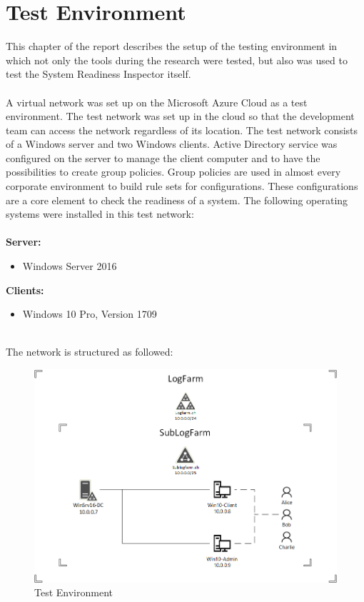 \section{Test Environment}\label{sec:testenvironment}
This chapter of the report describes the setup of the testing environment in which not only the tools during the research were tested, but also was used to test the System Readiness Inspector itself.
\\\\
A virtual network was set up on the Microsoft Azure Cloud as a test environment. The test network was set up in the cloud so that the development team can access the network regardless of its location. The test network consists of a Windows server and two Windows clients. Active Directory service was configured on the server to manage the client computer and to have the possibilities to create group policies. Group policies are used in almost every corporate environment to build rule sets for configurations. These configurations are a core element to check the readiness of a system. The following operating systems were installed in this test network: \\
\\
\textbf{Server:}
\begin{itemize}
    \item Windows Server 2016
\end{itemize}
\textbf{Clients:}
\begin{itemize}
    \item Windows 10 Pro, Version 1709
\end{itemize}
\ \\
The network is structured as followed:\\
\begin{figure}[H]
    \centering
    \includegraphics[width=0.9\linewidth]{assets/test-environment/testnetwork.png}
    \caption{Test Environment}
\end{figure}

